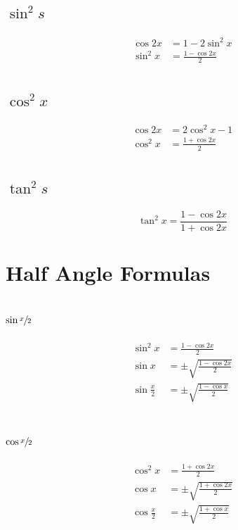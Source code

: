 \documentclass{exam}
\begin{document}
  \subsection{$\sin^2 s$}
  \begin{align*}
    \cos 2x  & = 1 - 2 \sin^2 x \\
    \sin^2 x & = \frac{1 - \cos 2x}{2} \\
  \end{align*}

  \subsection{$\cos^2 x$}
  \begin{align*}
    \cos 2x  & = 2 \cos^2 x - 1 \\
    \cos^2 x & = \frac{1 + \cos 2x}{2} \\
  \end{align*}

  \subsection{$\tan^2 s$}
  \[
    \tan^2 x = \frac{1 - \cos 2x}{1 + \cos 2x}
  \]

  \section{Half Angle Formulas}

  \subsection{$\sin \sfrac{x}{2}$}
  \begin{align*}
    \sin^2 x         & = \frac{1 - \cos 2x}{2} \\
    \sin x           & = \pm \sqrt{ \frac{1 - \cos 2x}{2} } \\
    \sin \frac{x}{2} & = \pm \sqrt{ \frac{1 - \cos x}{2} } \\
  \end{align*}

  \subsection{$\cos \sfrac{x}{2}$}
  \begin{align*}
    \cos^2 x         & = \frac{1 + \cos 2x}{2} \\
    \cos x           & = \pm \sqrt{ \frac{1 + \cos 2x}{2} } \\
    \cos \frac{x}{2} & = \pm \sqrt{ \frac{1 + \cos x}{2} } \\
  \end{align*}
\end{document}
